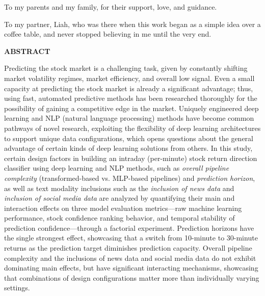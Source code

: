 \documentclass[stu,floatsintext]{apa7}
\begin{document}
To my parents and my family,
for their support, love, and guidance.

To my partner, Liah, who was there when this work began as a simple idea over a coffee table, and never stopped believing in me until the very end.

\newpage
{}
{}
\begin{center}
{\bfseries ABSTRACT}
\end{center}
\vspace{0.3in}

Predicting the stock market is a challenging task, given by constantly shifting market volatility regimes, market efficiency, and overall low signal. Even a small capacity at predicting the stock market is already a significant advantage; thus, using fast, automated predictive methods has been researched thoroughly for the possibility of gaining a competitive edge in the market. Uniquely engineered deep learning and NLP (natural language processing) methods have become common pathways of novel research, exploiting the flexibility of deep learning architectures to support unique data configurations, which opens questions about the general advantage of certain kinds of deep learning solutions from others. In this study, certain design factors in building an intraday (per-minute) stock return direction classifier using deep learning and NLP methods, such as \textit{overall pipeline complexity} (transformed-based vs. MLP-based pipelines) and \textit{prediction horizon}, as well as text modality inclusions such as the \textit{inclusion of news data} and \textit{inclusion of social media data} are analyzed by quantifying their main and interaction effects on three model evaluation metrics—raw machine learning performance, stock confidence ranking behavior, and temporal stability of prediction confidence—through a factorial experiment. Prediction horizons have the single strongest effect, showcasing that a switch from 10-minute to 30-minute returns as the prediction target diminishes prediction capacity. Overall pipeline complexity and the inclusions of news data and social media data do not exhibit dominating main effects, but have significant interacting mechanisms, showcasing that combinations of design configurations matter more than individually varying settings.\textit{}
\end{document}
